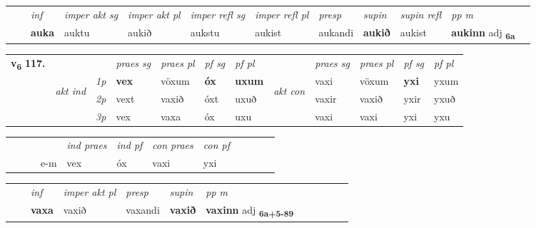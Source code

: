 \begin{tabular}{llllllllllll}
 & & \textit{inf} & \textit{imper akt sg} & \textit{imper akt pl} & \textit{imper refl sg} & \textit{imper refl pl} & \textit{presp} & \textit{supin} & \textit{supin refl} & \textit{pp m}     \\*
  & & \textbf{auka} & auktu  & aukið & aukstu & aukist & aukandi &  \textbf{aukið} & aukist & \textbf{aukinn} adj \textbf{\textsubscript{6a}} \\*
\cmidrule{1-12}
\end{tabular}



\begin{tabular}{llllllllllll} \toprule
\multirow{4}{*}{{{\textbf{v{\textsubscript{6}}} \Large{\textbf{117.}}}}}  & &   &  \textit{praes sg}  & \textit{praes pl}  &\textit{ pf sg} & \textit{pf pl} &  &  \textit{praes sg}  & \textit{praes pl}  & \textit{pf sg} & \textit{pf pl } \\*
	\cmidrule{4-7} \cmidrule{9-12}
 & \multirow{3}{*}{\begin{turn}{90}\textit{akt ind}\end{turn}} & {\textit{1p}} & \textbf{vex} & vöxum    & \textbf{óx} & \textbf{uxum} & \multirow{3}{*}{\begin{turn}{90}\textit{akt con}\end{turn}} &vaxi & vöxum & \textbf{yxi} & yxum\\*
& &  {\textit{2p}} &  vext  & vaxið   & óxt & uxuð & & vaxir & vaxið & yxir & yxuð \\*
& &  {\textit{3p}} & vex & vaxa   & óx & uxu & & vaxi & vaxi& yxi & yxu  \\*
\cmidrule{4-7} \cmidrule{9-12}
\end{tabular}


\begin{tabular}{llllllllllll}
 & &  & &  \textit{ind praes} & \textit{ind pf} & \textit{con praes} & \textit{con pf} \\*
&  & & e-m & vex & óx & vaxi & yxi \\*
\cmidrule{5-9}
\end{tabular}


\begin{tabular}{llllllllllll}
 & & \textit{inf}  & \textit{imper akt pl}   & \textit{presp} & \textit{supin}  & \textit{pp m}     \\*
  & & \textbf{vaxa}   & vaxið   & vaxandi &  \textbf{vaxið}  & \textbf{vaxinn} adj \textbf{\textsubscript{6a+5-89}} \\*
\cmidrule{1-12}
\end{tabular}



